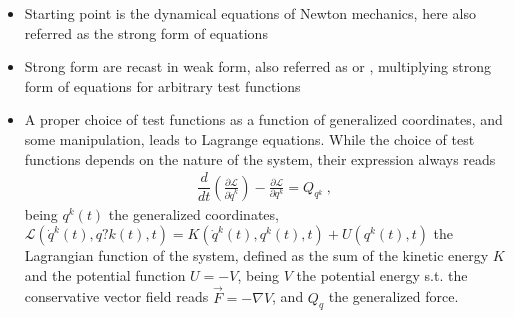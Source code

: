 \documentclass[letterpaper,10pt,english]{jupyterBook}
\begin{document}
\begin{itemize}
\item {} 
\sphinxAtStartPar
{} Starting point is the dynamical equations of Newton mechanics, here also referred as the strong form of equations

\item {} 
\sphinxAtStartPar
{} Strong form are recast in weak form, also referred as  or , multiplying strong form of equations for arbitrary test functions

\item {} 
\sphinxAtStartPar
{} A proper choice of test functions as a function of generalized coordinates, and some manipulation, leads to Lagrange equations. While the choice of test functions depends on the nature of the system, their expression always reads
\begin{equation}\label{equation:ch/lagrange-ii-type:eq:lagrange-eq}
\begin{split}\dfrac{d}{dt}\left( \frac{\partial \mathscr{L}}{\partial \dot{q}^k} \right) - \frac{\partial \mathscr{L}}{\partial q^k} = Q_{q^k} \ ,\end{split}
\end{equation}
\sphinxAtStartPar
being \(q^k(t)\) the generalized coordinates, \(\mathscr{L}\left(\dot{q}^k(t), q?k(t), t \right) = K\left(\dot{q}^k(t), q^k(t), t\right) + U(q^k(t), t)\) the Lagrangian function of the system, defined as the sum of the kinetic energy \(K\) and the potential function \(U = - V\), being \(V\) the potential energy \sphinxhyphen{} s.t. the conservative vector field reads \(\vec{F} = - \nabla V\), and \(Q_q\) the generalized force.


\end{itemize}
\end{document}
